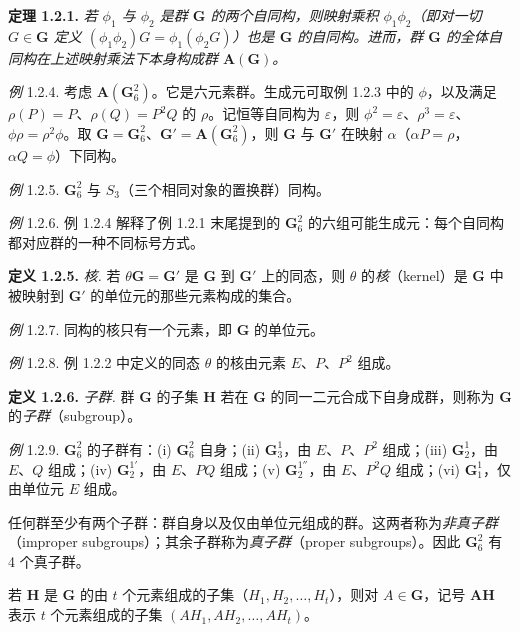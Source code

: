 \textbf{定理 1.2.1.} \textit{若 $\phi_{1}$ 与 $\phi_{2}$ 是群 $\mathbf{G}$ 的两个自同构，则映射乘积 $\phi_{1}\phi_{2}$（即对一切 $G \in \mathbf{G}$ 定义 $(\phi_{1}\phi_{2})G = \phi_{1}(\phi_{2}G)$）也是 $\mathbf{G}$ 的自同构。进而，群 $\mathbf{G}$ 的全体自同构在上述映射乘法下本身构成群 $\mathbf{A}(\mathbf{G})$。}

\textit{例} 1.2.4. 考虑 $\mathbf{A}(\mathbf{G}_6^2)$。它是六元素群。生成元可取例 1.2.3 中的 $\phi$，以及满足 $\rho(P) = P$、$\rho(Q) = P^{2}Q$ 的 $\rho$。记恒等自同构为 $\varepsilon$，则 $\phi^{2} = \varepsilon$、$\rho^{3} = \varepsilon$、$\phi\rho = \rho^{2}\phi$。取 $\mathbf{G} = \mathbf{G}_6^2$、$\mathbf{G}' = \mathbf{A}(\mathbf{G}_6^2)$，则 $\mathbf{G}$ 与 $\mathbf{G}'$ 在映射 $\alpha$（$\alpha P = \rho$，$\alpha Q = \phi$）下同构。

\textit{例} 1.2.5. $\mathbf{G}_6^2$ 与 $S_{3}$（三个相同对象的置换群）同构。

\textit{例} 1.2.6. 例 1.2.4 解释了例 1.2.1 末尾提到的 $\mathbf{G}_6^2$ 的六组可能生成元：每个自同构都对应群的一种不同标号方式。

\textbf{定义 1.2.5.} \textit{核.} 若 $\theta\mathbf{G} = \mathbf{G}'$ 是 $\mathbf{G}$ 到 $\mathbf{G}'$ 上的同态，则 $\theta$ 的\textit{核}（kernel）是 $\mathbf{G}$ 中被映射到 $\mathbf{G}'$ 的单位元的那些元素构成的集合。

\textit{例} 1.2.7. 同构的核只有一个元素，即 $\mathbf{G}$ 的单位元。

\textit{例} 1.2.8. 例 1.2.2 中定义的同态 $\theta$ 的核由元素 $E$、$P$、$P^{2}$ 组成。

\textbf{定义 1.2.6.} \textit{子群.} 群 $\mathbf{G}$ 的子集 $\mathbf{H}$ 若在 $\mathbf{G}$ 的同一二元合成下自身成群，则称为 $\mathbf{G}$ 的\textit{子群}（subgroup）。

\textit{例} 1.2.9. $\mathbf{G}_6^2$ 的子群有：(i) $\mathbf{G}_6^2$ 自身；(ii) $\mathbf{G}_3^1$，由 $E$、$P$、$P^{2}$ 组成；(iii) $\mathbf{G}_2^1$，由 $E$、$Q$ 组成；(iv) $\mathbf{G}_2^{1'}$，由 $E$、$PQ$ 组成；(v) $\mathbf{G}_2^{1''}$，由 $E$、$P^{2}Q$ 组成；(vi) $\mathbf{G}_1^1$，仅由单位元 $E$ 组成。

任何群至少有两个子群：群自身以及仅由单位元组成的群。这两者称为\textit{非真子群}（improper subgroups）；其余子群称为\textit{真子群}（proper subgroups）。因此 $\mathbf{G}_6^2$ 有 4 个真子群。

若 $\mathbf{H}$ 是 $\mathbf{G}$ 的由 $t$ 个元素组成的子集（$H_{1}, H_{2}, \ldots, H_{t}$），则对 $A \in \mathbf{G}$，记号 $\mathbf{AH}$ 表示 $t$ 个元素组成的子集 $(AH_{1}, AH_{2}, \ldots, AH_{t})$。

